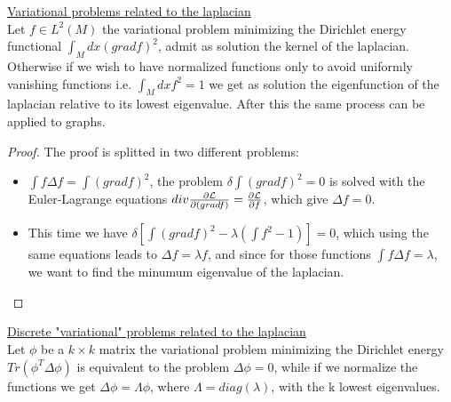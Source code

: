 \documentclass[../main.tex]{subfiles}
\begin{document}
\begin{prop}
    \underline{Variational problems related to the laplacian}\\
    Let $f \in L^2(M)$ the variational problem minimizing the Dirichlet energy functional $\int_M dx (gradf)^2$, 
    admit as solution the kernel of the laplacian. Otherwise if we wish to have normalized functions only
    to avoid uniformly vanishing functions i.e. $\int_M dx f^2 = 1$ we get as solution the eigenfunction of the laplacian
    relative to its lowest eigenvalue. After this the same process can be applied to graphs.
\end{prop}
\begin{proof} The proof is splitted in two different problems:
    \begin{itemize}
        \item 
	$\int f \Delta f = \int (gradf)^2$, the problem $\delta \int (gradf)^2 = 0$ is solved with the
	Euler-Lagrange equations $div \frac{\partial \mathcal{L}}{\partial (gradf)}=\frac{\partial \mathcal{L}}{\partial f}$, which give $\Delta f = 0$.
	\item
	This time we have $\delta[\int (gradf)^2 - \lambda (\int f^2 -1)]=0$, which using the same equations
	leads to $\Delta f = \lambda f$, and since for those functions $\int f \Delta f = \lambda$, we want to find
	the minumum eigenvalue of the laplacian.
    \end{itemize}
\end{proof}

\begin{prop}
    \underline{Discrete "variational" problems related to the laplacian}\\
    Let $\phi$ be a $k \times k$ matrix the variational problem minimizing the Dirichlet energy $Tr(\phi^T \Delta \phi)$ is equivalent to
    the problem $\Delta \phi = 0$, while if we normalize the functions we get $\Delta \phi = \Lambda \phi$, where $\Lambda = diag(\lambda)$, 
    with the k lowest eigenvalues.
\end{prop}
\end{document}
